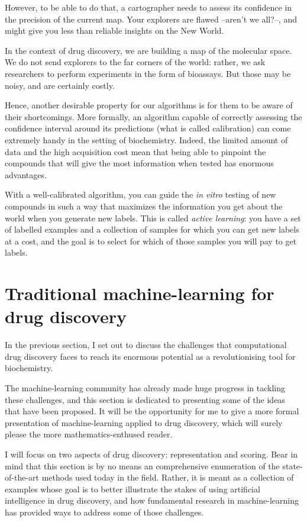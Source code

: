 \documentclass[11pt]{article}
\numberwithin{equation}{subsection}
\begin{document}
However, to be able to do that, a cartographer needs to assess its confidence in the precision of the current map. Your explorers are flawed –aren't we all?–, and might give you less than reliable insights on the New World.

In the context of drug discovery, we are building a map of the molecular space. We do not send explorers to the far corners of the world: rather, we ask researchers to perform experiments in the form of bioassays. But those may be noisy, and are certainly costly.

Hence, another desirable property for our algorithms is for them to be aware of their shortcomings. More formally, an algorithm capable of correctly assessing the confidence interval around its predictions (what is called calibration) can come extremely handy in the setting of biochemistry. Indeed, the limited amount of data and the high acquisition cost mean that being able to pinpoint the compounds that will give the most information when tested has enormous advantages.

With a well-calibrated algorithm, you can guide the \textit{in vitro} testing of new compounds in such a way that maximizes the information you get about the world when you generate new labels. This is called \textit{active learning}: you have a set of labelled examples and a collection of samples for which you can get new labels at a cost, and the goal is to select for which of those samples you will pay to get labels.



\clearpage
\section{Traditional machine-learning for drug discovery}

In the previous section, I set out to discuss the challenges that computational drug discovery faces to reach its enormous potential as a revolutionising tool for biochemistry.

The machine-learning community has already made huge progress in tackling these challenges, and this section is dedicated to presenting some of the ideas that have been proposed. It will be the opportunity for me to give a more formal presentation of machine-learning applied to drug discovery, which will surely please the more mathematics-enthused reader.

I will focus on two aspects of drug discovery: representation and scoring. Bear in mind that this section is by no means an comprehensive enumeration of the state-of-the-art methods used today in the field. Rather, it is meant as a collection of examples whose goal is to better illustrate the stakes of using artificial intelligence in drug discovery, and how fundamental research in machine-learning has provided ways to address some of those challenges.
\end{document}
